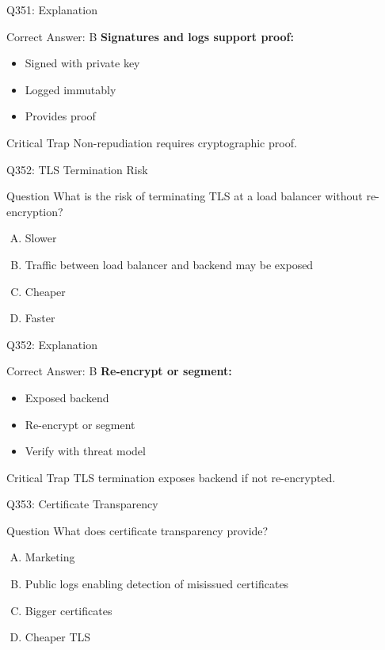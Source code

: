 \documentclass{beamer}
\begin{document}
	\begin{frame}{Q351: Explanation}
		\begin{block}{Correct Answer: B}
			\textbf{Signatures and logs support proof:}
			\begin{itemize}
				\item Signed with private key
				\item Logged immutably
				\item Provides proof
			\end{itemize}
		\end{block}
		\begin{alertblock}{Critical Trap}
			Non-repudiation requires cryptographic proof.
		\end{alertblock}
	\end{frame}
	
	\begin{frame}{Q352: TLS Termination Risk}
		\begin{block}{Question}
			What is the risk of terminating TLS at a load balancer without re-encryption?
		\end{block}
		\begin{enumerate}[(A)]
			\item Slower
			\item Traffic between load balancer and backend may be exposed
			\item Cheaper
			\item Faster
		\end{enumerate}
	\end{frame}
	
	\begin{frame}{Q352: Explanation}
		\begin{block}{Correct Answer: B}
			\textbf{Re-encrypt or segment:}
			\begin{itemize}
				\item Exposed backend
				\item Re-encrypt or segment
				\item Verify with threat model
			\end{itemize}
		\end{block}
		\begin{alertblock}{Critical Trap}
			TLS termination exposes backend if not re-encrypted.
		\end{alertblock}
	\end{frame}
	
	\begin{frame}{Q353: Certificate Transparency}
		\begin{block}{Question}
			What does certificate transparency provide?
		\end{block}
		\begin{enumerate}[(A)]
			\item Marketing
			\item Public logs enabling detection of misissued certificates
			\item Bigger certificates
			\item Cheaper TLS
		\end{enumerate}
	\end{frame}
	
\end{document}
